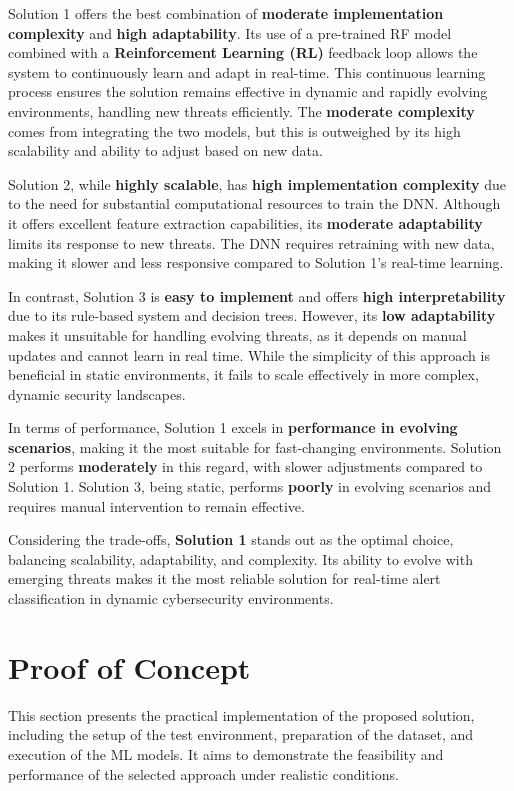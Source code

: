 \normalsize

Solution 1 offers the best combination of \textbf{moderate implementation complexity} and \textbf{high adaptability}. 
Its use of a pre-trained RF model combined with a \textbf{Reinforcement Learning (RL)} feedback loop allows the system to continuously learn and adapt in real-time. 
This continuous learning process ensures the solution remains effective in dynamic and rapidly evolving environments, handling new threats efficiently. 
The \textbf{moderate complexity} comes from integrating the two models, but this is outweighed by its high scalability and ability to adjust based on new data.

Solution 2, while \textbf{highly scalable}, has \textbf{high implementation complexity} due to the need for substantial computational resources to train the DNN. 
Although it offers excellent feature extraction capabilities, its \textbf{moderate adaptability} limits its response to new threats. 
The DNN requires retraining with new data, making it slower and less responsive compared to Solution 1's real-time learning.

In contrast, Solution 3 is \textbf{easy to implement} and offers \textbf{high interpretability} due to its rule-based system and decision trees. 
However, its \textbf{low adaptability} makes it unsuitable for handling evolving threats, as it depends on manual updates and cannot learn in real time. 
While the simplicity of this approach is beneficial in static environments, it fails to scale effectively in more complex, dynamic security landscapes.

In terms of performance, Solution 1 excels in \textbf{performance in evolving scenarios}, making it the most suitable for fast-changing environments. 
Solution 2 performs \textbf{moderately} in this regard, with slower adjustments compared to Solution 1. 
Solution 3, being static, performs \textbf{poorly} in evolving scenarios and requires manual intervention to remain effective.

Considering the trade-offs, \textbf{Solution 1} stands out as the optimal choice, balancing scalability, adaptability, and complexity. 
Its ability to evolve with emerging threats makes it the most reliable solution for real-time alert classification in dynamic cybersecurity environments.

\section{Proof of Concept}
This section presents the practical implementation of the proposed solution, including the setup of the test environment, preparation of the dataset, and execution of the ML models. It aims to demonstrate the feasibility and performance of the selected approach under realistic conditions.

